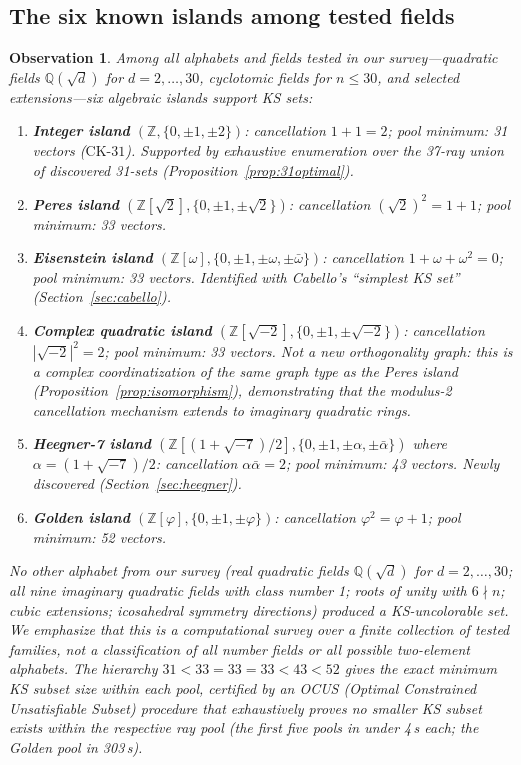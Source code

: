 \documentclass[12pt,a4paper]{article}
\newtheorem{observation}[theorem]{Observation}
\newcommand{\Z}{\mathbb{Z}}
\newcommand{\Q}{\mathbb{Q}}
\newcommand{\CK}{\mathrm{CK}\text{-}31}
\begin{document}
\subsection{The six known islands among tested fields}\label{sec:sixislands}

\begin{observation}\label{obs:islands}
Among all alphabets and fields tested in our survey---quadratic fields $\Q(\sqrt{d})$ for $d = 2, \ldots, 30$, cyclotomic fields for $n \leq 30$, and selected extensions---six algebraic islands support KS sets:
\begin{enumerate}[label=(\arabic*)]
    \item \textbf{Integer island} $(\Z, \{0,\pm 1,\pm 2\})$: cancellation $1 + 1 = 2$; pool minimum: 31 vectors ($\CK$). Supported by exhaustive enumeration over the 37-ray union of discovered 31-sets (Proposition~\ref{prop:31optimal}).
    \item \textbf{Peres island} $(\Z[\sqrt{2}], \{0,\pm 1,\pm\sqrt{2}\})$: cancellation $(\sqrt{2})^2 = 1 + 1$; pool minimum: 33 vectors.
    \item \textbf{Eisenstein island} $(\Z[\omega], \{0,\pm 1,\pm\omega,\pm\bar\omega\})$: cancellation $1 + \omega + \omega^2 = 0$; pool minimum: 33 vectors. Identified with Cabello's ``simplest KS set''~\cite{Cabello2025simplest} (Section~\ref{sec:cabello}).
    \item \textbf{Complex quadratic island} $(\Z[\sqrt{-2}], \{0,\pm 1,\pm\sqrt{-2}\})$: cancellation $|\sqrt{-2}|^2 = 2$; pool minimum: 33 vectors. Not a new orthogonality graph: this is a complex coordinatization of the same graph type as the Peres island (Proposition~\ref{prop:isomorphism}), demonstrating that the modulus-2 cancellation mechanism extends to imaginary quadratic rings.
    \item \textbf{Heegner-7 island} $(\Z[(1+\sqrt{-7})/2], \{0,\pm 1,\pm\alpha,\pm\bar\alpha\})$ where $\alpha = (1+\sqrt{-7})/2$: cancellation $\alpha\bar\alpha = 2$; pool minimum: 43 vectors. Newly discovered (Section~\ref{sec:heegner}).
    \item \textbf{Golden island} $(\Z[\varphi], \{0,\pm 1,\pm\varphi\})$: cancellation $\varphi^2 = \varphi + 1$; pool minimum: 52 vectors.
\end{enumerate}
No other alphabet from our survey (real quadratic fields $\Q(\sqrt{d})$ for $d = 2,\ldots,30$; all nine imaginary quadratic fields with class number 1; roots of unity with $6\nmid n$; cubic extensions; icosahedral symmetry directions) produced a KS-uncolorable set.  We emphasize that this is a computational survey over a finite collection of tested families, not a classification of all number fields or all possible two-element alphabets.  The hierarchy $31 < 33 = 33 = 33 < 43 < 52$ gives the exact minimum KS subset size \emph{within each pool}, certified by an OCUS (Optimal Constrained Unsatisfiable Subset) procedure that exhaustively proves no smaller KS subset exists within the respective ray pool (the first five pools in under 4\,s each; the Golden pool in 303\,s).
\end{observation}
\end{document}
